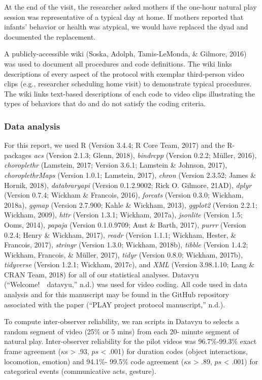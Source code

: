 \documentclass[english,man]{apa6}
\theoremstyle{definition}
\theoremstyle{definition}
\theoremstyle{definition}
\theoremstyle{remark}
\begin{document}
At the end of the visit, the researcher asked mothers if the one-hour
natural play session was representative of a typical day at home. If
mothers reported that infants' behavior or health was atypical, we would
have replaced the dyad and documented the replacement.

A publicly-accessible wiki (Soska, Adolph, Tamis-LeMonda, \& Gilmore,
2016) was used to document all procedures and code definitions. The wiki
links descriptions of every aspect of the protocol with exemplar
third-person video clips (e.g., researcher scheduling home visit) to
demonstrate typical procedures. The wiki links text-based descriptions
of each code to video clips illustrating the types of behaviors that do
and do not satisfy the coding criteria.

\subsubsection{Data analysis}\label{data-analysis}

For this report, we used R (Version 3.4.4; R Core Team, 2017) and the
R-packages \emph{acs} (Version 2.1.3; Glenn, 2018), \emph{bindrcpp}
(Version 0.2.2; Müller, 2016), \emph{choroplethr} (Lamstein, 2017;
Version 3.6.1; Lamstein \& Johnson, 2017), \emph{choroplethrMaps}
(Version 1.0.1; Lamstein, 2017), \emph{chron} (Version 2.3.52; James \&
Hornik, 2018), \emph{databraryapi} (Version 0.1.2.9002; Rick O. Gilmore,
21AD), \emph{dplyr} (Version 0.7.4; Wickham \& Francois, 2016),
\emph{forcats} (Version 0.3.0; Wickham, 2018a), \emph{ggmap} (Version
2.7.900; Kahle \& Wickham, 2013), \emph{ggplot2} (Version 2.2.1;
Wickham, 2009), \emph{httr} (Version 1.3.1; Wickham, 2017a),
\emph{jsonlite} (Version 1.5; Ooms, 2014), \emph{papaja} (Version
0.1.0.9709; Aust \& Barth, 2017), \emph{purrr} (Version 0.2.4; Henry \&
Wickham, 2017), \emph{readr} (Version 1.1.1; Wickham, Hester, \&
Francois, 2017), \emph{stringr} (Version 1.3.0; Wickham, 2018b),
\emph{tibble} (Version 1.4.2; Wickham, Francois, \& Müller, 2017),
\emph{tidyr} (Version 0.8.0; Wickham, 2017b), \emph{tidyverse} (Version
1.2.1; Wickham, 2017c), and \emph{XML} (Version 3.98.1.10; Lang \& CRAN
Team, 2018) for all of our statistical analyses. Datavyu
(``Welcome!~\textbar{}\textbar{}~datavyu,'' n.d.) was used for video
coding. All code used in data analysis and for this manuscript may be
found in the GitHub repository associated with the paper (``PLAY project
protocol manuscript,'' n.d.).

To compute inter-observer reliability, we ran scripts in Datavyu to
selects a random segment of video (25\% or 5 mins) from each 20- minute
segment of natural play. Inter-observer reliability for the pilot videos
was 96.7\%-99.3\% exact frame agreement (\(\kappa\)s \textgreater{} .93,
\(ps\) \textless{} .001) for duration codes (object interactions,
locomotion, emotion) and 94.1\%- 99.5\% code agreement (\(\kappa\)s
\textgreater{} .89, \(ps\) \textless{} .001) for categorical events
(communicative acts, gesture).
\end{document}
